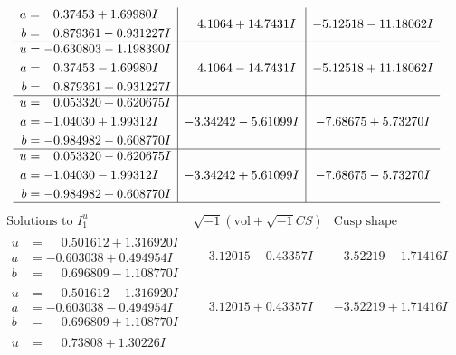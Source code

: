 \documentclass[1p]{elsarticle_modified}
\theoremstyle{definition}
\newcommand{\I}{\sqrt{-1}}
\begin{document}
$$\begin{array}{c|c|c}
\begin{aligned}
a &= \phantom{-}0.37453 + 1.69980 I \\
b &= \phantom{-}0.879361 - 0.931227 I\end{aligned}
 & \phantom{-}4.1064 + 14.7431 I & -5.12518 - 11.18062 I \\ \hline\begin{aligned}
u &= -0.630803 - 1.198390 I \\
a &= \phantom{-}0.37453 - 1.69980 I \\
b &= \phantom{-}0.879361 + 0.931227 I\end{aligned}
 & \phantom{-}4.1064 - 14.7431 I & -5.12518 + 11.18062 I \\ \hline\begin{aligned}
u &= \phantom{-}0.053320 + 0.620675 I \\
a &= -1.04030 + 1.99312 I \\
b &= -0.984982 - 0.608770 I\end{aligned}
 & -3.34242 - 5.61099 I & -7.68675 + 5.73270 I \\ \hline\begin{aligned}
u &= \phantom{-}0.053320 - 0.620675 I \\
a &= -1.04030 - 1.99312 I \\
b &= -0.984982 + 0.608770 I\end{aligned}
 & -3.34242 + 5.61099 I & -7.68675 - 5.73270 I\\
 \hline 
 \end{array}$$\newpage$$\begin{array}{c|c|c}  
\text{Solutions to }I^u_{1}& \I (\text{vol} + \sqrt{-1}CS) & \text{Cusp shape}\\
 \hline 
\begin{aligned}
u &= \phantom{-}0.501612 + 1.316920 I \\
a &= -0.603038 + 0.494954 I \\
b &= \phantom{-}0.696809 - 1.108770 I\end{aligned}
 & \phantom{-}3.12015 - 0.43357 I & -3.52219 - 1.71416 I \\ \hline\begin{aligned}
u &= \phantom{-}0.501612 - 1.316920 I \\
a &= -0.603038 - 0.494954 I \\
b &= \phantom{-}0.696809 + 1.108770 I\end{aligned}
 & \phantom{-}3.12015 + 0.43357 I & -3.52219 + 1.71416 I \\ \hline\begin{aligned}
u &= \phantom{-}0.73808 + 1.30226 I \\

\end{aligned}
\end{array}$$
\end{document}
